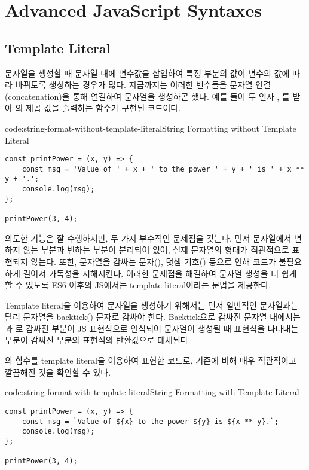 \section{Advanced JavaScript Syntaxes}\label{sect:advanced-javascript-syntaxes}

\subsection*{Template Literal}

문자열을 생성할 때 문자열 내에 변수값을 삽입하여 특정 부분의 값이 변수의 값에 따라 바뀌도록 생성하는 경우가 많다. 지금까지는 이러한 변수들을 문자열 연결(concatenation)을 통해 연결하여 문자열을 생성하곤 했다. 예를 들어 \은 두 인자 , 를 받아 의  제곱 값을 출력하는 함수가 구현된 코드이다.

\begin{codeenv}{code:string-format-without-template-literal}{String Formatting without Template Literal}\begin{verbatim}
const printPower = (x, y) => {
    const msg = 'Value of ' + x + ' to the power ' + y + ' is ' + x ** y + '.';
    console.log(msg);
};

printPower(3, 4);
\end{verbatim}
\end{codeenv}

\은 의도한 기능은 잘 수행하지만, 두 가지 부수적인 문제점을 갖는다. 먼저  문자열에서 변하지 않는 부분과 변하는 부분이 분리되어 있어, 실제 문자열의 형태가 직관적으로 표현되지 않는다. 또한, 문자열을 감싸는 문자(), 덧셈 기호(\cd{+}) 등으로 인해 코드가 불필요하게 길어져 가독성을 저해시킨다. 이러한 문제점을 해결하여 문자열 생성을 더 쉽게 할 수 있도록 ES6 이후의 JS에서는 template literal이라는 문법을 제공한다.

Template literal을 이용하여 문자열을 생성하기 위해서는 먼저 일반적인 문자열과는 달리 문자열을 backtick() 문자로 감싸야 한다. Backtick으로 감싸진 문자열 내에서는 \cd{\$\{}과 \cd{\}}로 감싸진 부분이 JS 표현식으로 인식되어 문자열이 생성될 때 표현식을 나타내는 부분이 감싸진 부분의 표현식의 반환값으로 대체된다.

\은 의 함수를 template literal을 이용하여 표현한 코드로, 기존에 비해 매우 직관적이고 깔끔해진 것을 확인할 수 있다.

\begin{codeenv}{code:string-format-with-template-literal}{String Formatting with Template Literal}\begin{verbatim}
const printPower = (x, y) => {
    const msg = `Value of ${x} to the power ${y} is ${x ** y}.`;
    console.log(msg);
};

printPower(3, 4);
\end{verbatim}
\end{codeenv}

